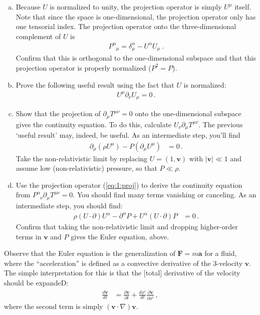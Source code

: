 \documentclass[12pt]{article}
\numberwithin{equation}{section}    %
\renewcommand{\vec}[1]{\mathbf{#1}} %
\begin{document}
\begin{enumerate}[(a)]
\item Because $U$ is normalized to unity, the projection operator is simply $U^\mu$ itself. Note that since the space is one-dimensional, the projection operator only has one tensorial index. The projection operator onto the three-dimensional complement of $U$ is 
\begin{align}
P^\alpha_{\phantom\alpha \mu} = \delta^\alpha_\mu - U^\alpha U_\mu \ .
\label{eq:1:proj}
\end{align}
Confirm that this is orthogonal to the one-dimensional subspace and that this projection operator is properly normalized ($P^2 = P$).

\item Prove the following useful result using the fact that $U$ is normalized:
\begin{align}
U^\mu \partial_\nu U_\mu = 0 \, .	
\end{align}

\item Show that the projection of $\partial_\mu T^{\mu\nu} = 0$ onto the one-dimensional subspace gives the continuity equation. To do this, calculate $U_\nu\partial_\mu T^{\mu\nu}$. The previous `useful result' may, indeed, be useful. As an intermediate step, you'll find
\begin{align}
	\partial_\mu(\rho U^\mu) - P(\partial_\mu U^\mu) &= 0 \, .
\end{align}
Take the non-relativistic limit by replacing $U = (1,\vec v)$ with $|\vec v| \ll 1$ and assume low (non-relativistic) pressure, so that $P \ll \rho$. 

\item Use the projection operator (\ref{eq:1:proj}) to derive the continuity equation from $P^\alpha_{\phantom\alpha \nu}\partial_\mu T^{\mu\nu} = 0$. You should find many terms vanishing or canceling. As an intermediate step, you should find:
\begin{align}
	\rho(U\cdot \partial)U^\alpha - \partial^\alpha P + U^\alpha (U\cdot \partial) P &= 0 \, .
\end{align}
Confirm that taking the non-relativistic limit and dropping higher-order terms in $\vec v$ and $P$ gives the Euler equation, above. 
\end{enumerate}

Observe that the Euler equation is the generalization of $\vec F=m\vec a$ for a fluid, where the ``acceleration'' is defined as a convective derivative of the 3-velocity $\vec v$. 
The simple interpretation for this is that the [total] derivative of the velocity should be expandeD:
\begin{align}
	\frac{d\vec v}{dt} &= \frac{\partial\vec v}{\partial t}
	+ \frac{dx^i}{dt} \frac{\partial \vec v}{\partial x^i} \, ,
\end{align}
where the second term is simply $(\vec v \cdot \nabla)\vec v$. 
\end{document}
